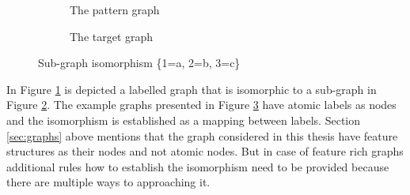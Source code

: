 \begin{figure}[!ht]
    \centering
    \begin{subfigure}[t]{0.48\textwidth}
        \centering
        \caption{The pattern graph}
        \label{fig:example-matching1}
    \end{subfigure}
    \begin{subfigure}[t]{0.48\textwidth}
        \centering
        \caption{The target graph}
        \label{fig:example-matching2}
    \end{subfigure}
    \caption{Sub-graph isomorphism \{1=a, 2=b, 3=c\}}
    \label{fig:example-matching}
\end{figure}

In Figure \ref{fig:example-matching1} is depicted a labelled graph that is isomorphic to a sub-graph in Figure \ref{fig:example-matching2}. The example graphs presented in Figure \ref{fig:example-matching} have atomic labels as nodes and the isomorphism is established as a mapping between labels. Section \ref{sec:graphs} above mentions that the graph considered in this thesis have feature structures as their nodes and not atomic nodes. But in case of feature rich graphs additional rules how to establish the isomorphism need to be provided because there are multiple ways to approaching it. 

